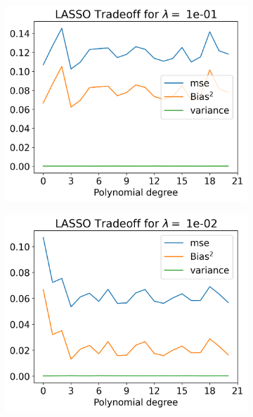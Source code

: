 \documentclass[12pt]{article}
\begin{document}
\begin{figure}[H]
  \begin{subfigure}{.5\textwidth}
    \centering
    \includegraphics[width=\textwidth]{../figures/tradeoff_LASSO_1e-01_20.png}
    \caption{}
    \label{fig:l_1e-08}
  \end{subfigure}
  \begin{subfigure}{.5\textwidth}
    \centering
    \includegraphics[width=\textwidth]{../figures/tradeoff_LASSO_1e-02_20.png}
    \caption{}
    \label{fig:l_1e-09}
  \end{subfigure}
  \begin{subfigure}{.5\textwidth}

\end{subfigure}
\end{figure}
\end{document}
